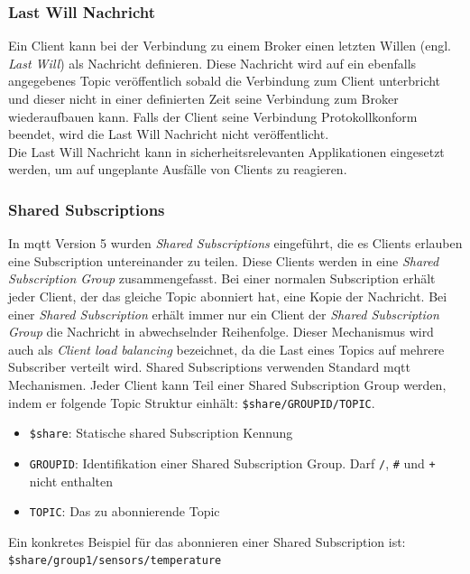 \subsubsection{Last Will Nachricht} \label{s:last-will}
Ein Client kann bei der Verbindung zu einem Broker einen letzten Willen (engl. \textit{Last Will}) als Nachricht definieren. Diese Nachricht wird auf ein ebenfalls angegebenes Topic veröffentlich sobald die Verbindung zum Client unterbricht und dieser nicht in einer definierten Zeit seine Verbindung zum Broker wiederaufbauen kann. Falls der Client seine Verbindung Protokollkonform beendet, wird die Last Will Nachricht nicht veröffentlicht.
\cite{soniSURVEYMQTTPROTOCOL}\\
Die Last Will Nachricht kann in sicherheitsrelevanten Applikationen eingesetzt werden, um auf ungeplante Ausfälle von Clients zu reagieren.

\subsubsection{Shared Subscriptions} \label{s:shared-subsriptions}
In \ac{mqtt} Version 5 wurden \textit{Shared Subscriptions} eingeführt, die es Clients erlauben eine Subscription untereinander zu teilen. Diese Clients werden in eine \textit{Shared Subscription Group} zusammengefasst. Bei einer normalen Subscription erhält jeder Client, der das gleiche Topic abonniert hat, eine Kopie der Nachricht. Bei einer \textit{Shared Subscription} erhält immer nur ein Client der \textit{Shared Subscription Group} die Nachricht in abwechselnder Reihenfolge. Dieser Mechanismus wird auch als \textit{Client load balancing} bezeichnet, da die Last eines Topics auf mehrere Subscriber verteilt wird.\cite{raschbichlerMQTTHowNew}
Shared Subscriptions verwenden Standard \ac{mqtt} Mechanismen. Jeder Client kann Teil einer Shared Subscription Group werden, indem er folgende Topic Struktur einhält: \verb|$share/GROUPID/TOPIC|.
\begin{itemize}
    \item \verb|$share|: Statische shared Subscription Kennung
    \item \verb|GROUPID|: Identifikation einer Shared Subscription Group. Darf \verb|/|, \verb|#| und \verb|+| nicht enthalten
    \item \verb|TOPIC|: Das zu abonnierende Topic
\end{itemize}
Ein konkretes Beispiel für das abonnieren einer Shared Subscription ist:
\newline
\verb|$share/group1/sensors/temperature|

